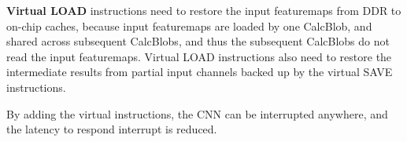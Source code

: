 \textbf{Virtual LOAD} instructions need to restore the input featuremaps from DDR to on-chip caches, because input featuremaps are loaded by one CalcBlob, and shared across subsequent CalcBlobs, and thus the subsequent CalcBlobs do not read the input featuremaps. Virtual LOAD instructions also need to restore the intermediate results from partial input channels backed up by the virtual SAVE instructions.

By adding the virtual instructions, the CNN can be interrupted anywhere, and the latency to respond interrupt is reduced.








